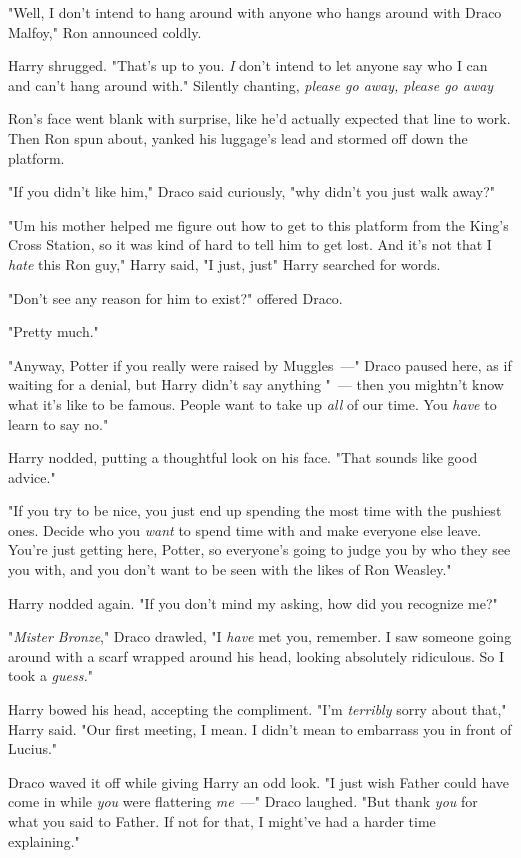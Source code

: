 "Well, I don't intend to hang around with anyone who hangs around with Draco
Malfoy," Ron announced coldly.

Harry shrugged. "That's up to you. \emph{I} don't intend to let anyone say who
I can and can't hang around with." Silently chanting, \emph{please go away,
please go away{\el}}

Ron's face went blank with surprise, like he'd actually expected that line to
work. Then Ron spun about, yanked his luggage's lead and stormed off down the
platform.

"If you didn't like him," Draco said curiously, "why didn't you just walk away?"

"Um{\el} his mother helped me figure out how to get to this platform from
the King's Cross Station, so it was kind of hard to tell him to get lost. And
it's not that I \emph{hate} this Ron guy," Harry said, "I just, just{\el}"
Harry searched for words.

"Don't see any reason for him to exist?" offered Draco.

"Pretty much."

"Anyway, Potter{\el} if you really were raised by Muggles~---" Draco paused
here, as if waiting for a denial, but Harry didn't say anything "~--- then you
mightn't know what it's like to be famous. People want to take up \emph{all} of
our time. You \emph{have} to learn to say no."

Harry nodded, putting a thoughtful look on his face. "That sounds like good
advice."

"If you try to be nice, you just end up spending the most time with the
pushiest ones. Decide who you \emph{want} to spend time with and make everyone
else leave. You're just getting here, Potter, so everyone's going to judge you
by who they see you with, and you don't want to be seen with the likes of Ron
Weasley."

Harry nodded again. "If you don't mind my asking, how did you recognize me?"

"\emph{Mister Bronze}," Draco drawled, "I \emph{have} met you, remember. I saw
someone going around with a scarf wrapped around his head, looking absolutely
ridiculous. So I took a \emph{guess.}"

Harry bowed his head, accepting the compliment. "I'm \emph{terribly} sorry
about that," Harry said. "Our first meeting, I mean. I didn't mean to embarrass
you in front of Lucius."

Draco waved it off while giving Harry an odd look. "I just wish Father could
have come in while \emph{you} were flattering \emph{me}~---" Draco laughed. "But
thank \emph{you} for what you said to Father. If not for that, I might've had a
harder time explaining."

